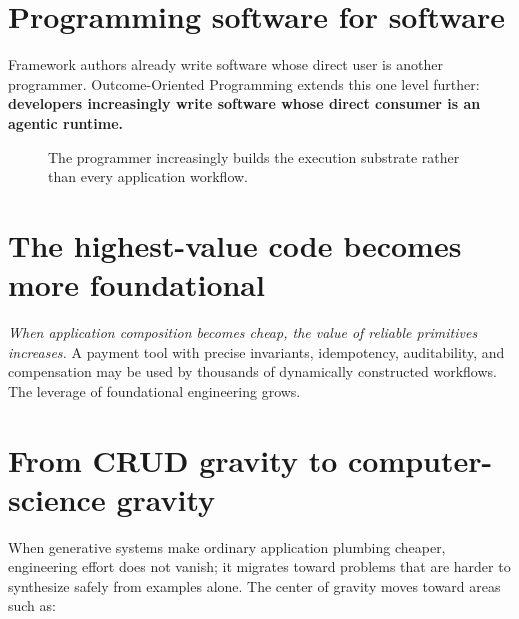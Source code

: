 \documentclass[10pt,oneside,openany]{book}
\begin{document}
\section{Programming software for software}
Framework authors already write software whose direct user is another programmer. Outcome-Oriented Programming extends this one level further: \textbf{developers increasingly write software whose direct consumer is an agentic runtime.}

\begin{figure}[ht]
\centering
{}
\caption{The programmer increasingly builds the execution substrate rather than every application workflow.}
\end{figure}

\section{The highest-value code becomes more foundational}
\emph{When application composition becomes cheap, the value of reliable primitives increases.} A payment tool with precise invariants, idempotency, auditability, and compensation may be used by thousands of dynamically constructed workflows. The leverage of foundational engineering grows.


\section{From CRUD gravity to computer-science gravity}
When generative systems make ordinary application plumbing cheaper, engineering effort does not vanish; it migrates toward problems that are harder to synthesize safely from examples alone. The center of gravity moves toward areas such as:
\end{document}
